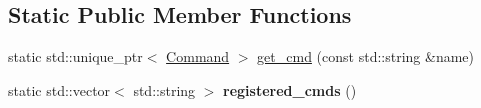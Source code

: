 \subsection*{Static Public Member Functions}
\begin{DoxyCompactItemize}
\item 
static std\+::unique\+\_\+ptr$<$ \mbox{\hyperlink{class_botan___c_l_i_1_1_command}{Command}} $>$ \mbox{\hyperlink{class_botan___c_l_i_1_1_command_a2bf2603ec9998286f53f751c1d6ab9e1}{get\+\_\+cmd}} (const std\+::string \&name)
\item 
\mbox{\label{class_botan___c_l_i_1_1_command_ab285f5ca7d3bb98fc9cef2fc6d4f863a}} 
static std\+::vector$<$ std\+::string $>$ {\bfseries registered\+\_\+cmds} ()
\end{DoxyCompactItemize}
